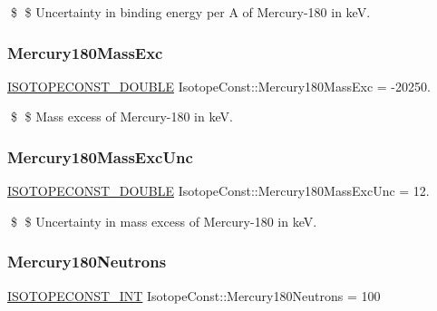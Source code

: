 \$ \$ Uncertainty in binding energy per A of Mercury-\/180 in keV. \mbox{\label{group___isotope_const-_mercury-_hg180_ga0db6e8e10562fa8b8eefc3d3bb10924d}} 
\subsubsection{\texorpdfstring{Mercury180\+Mass\+Exc}{Mercury180MassExc}}
{\footnotesize\ttfamily \mbox{\hyperlink{group___isotope_const-_macros_ga8f45a7272ce02c0b4c65c44636ed719a}{I\+S\+O\+T\+O\+P\+E\+C\+O\+N\+S\+T\+\_\+\+D\+O\+U\+B\+LE}} Isotope\+Const\+::\+Mercury180\+Mass\+Exc = -\/20250.}

\$ \$ Mass excess of Mercury-\/180 in keV. \mbox{\label{group___isotope_const-_mercury-_hg180_gac1ebb526c10f005dbccf1abed510f6bf}} 
\subsubsection{\texorpdfstring{Mercury180\+Mass\+Exc\+Unc}{Mercury180MassExcUnc}}
{\footnotesize\ttfamily \mbox{\hyperlink{group___isotope_const-_macros_ga8f45a7272ce02c0b4c65c44636ed719a}{I\+S\+O\+T\+O\+P\+E\+C\+O\+N\+S\+T\+\_\+\+D\+O\+U\+B\+LE}} Isotope\+Const\+::\+Mercury180\+Mass\+Exc\+Unc = 12.}

\$ \$ Uncertainty in mass excess of Mercury-\/180 in keV. \mbox{\label{group___isotope_const-_mercury-_hg180_ga3f1988cc0e0bbae6a6547c2cab7c669e}} 
\subsubsection{\texorpdfstring{Mercury180\+Neutrons}{Mercury180Neutrons}}
{\footnotesize\ttfamily \mbox{\hyperlink{group___isotope_const-_macros_ga5f18360b3e99483a35c32d789e62621c}{I\+S\+O\+T\+O\+P\+E\+C\+O\+N\+S\+T\+\_\+\+I\+NT}} Isotope\+Const\+::\+Mercury180\+Neutrons = 100}

